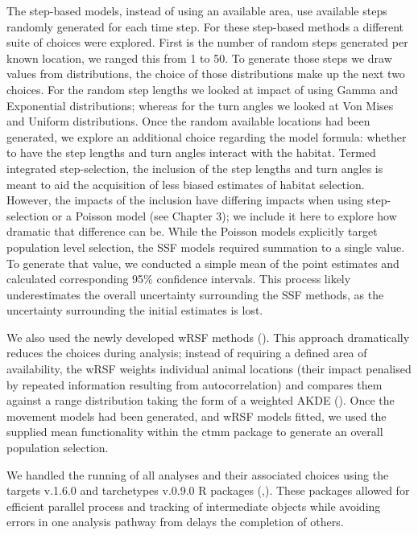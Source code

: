 \documentclass[10pt,a4paper]{article}
\begin{document}
The step-based models, instead of using an available area, use available steps randomly generated for each time step.
For these step-based methods a different suite of choices were explored.
First is the number of random steps generated per known location, we ranged this from 1 to 50.
To generate those steps we draw values from distributions, the choice of those distributions make up the next two choices.
For the random step lengths we looked at impact of using Gamma and Exponential distributions; whereas for the turn angles we looked at Von Mises and Uniform distributions.
Once the random available locations had been generated, we explore an additional choice regarding the model formula: whether to have the step lengths and turn angles interact with the habitat.
Termed integrated step-selection, the inclusion of the step lengths and turn angles is meant to aid the acquisition of less biased estimates of habitat selection.
However, the impacts of the inclusion have differing impacts when using step-selection or a Poisson model (see Chapter 3); we include it here to explore how dramatic that difference can be.
While the Poisson models explicitly target population level selection, the SSF models required summation to a single value.
To generate that value, we conducted a simple mean of the point estimates and calculated corresponding 95\% confidence intervals.
This process likely underestimates the overall uncertainty surrounding the SSF methods, as the uncertainty surrounding the initial estimates is lost.

We also used the newly developed wRSF methods ().
This approach dramatically reduces the choices during analysis; instead of requiring a defined area of availability, the wRSF weights individual animal locations (their impact penalised by repeated information resulting from autocorrelation) and compares them against a range distribution taking the form of a weighted AKDE ().
Once the movement models had been generated, and wRSF models fitted, we used the supplied mean functionality within the ctmm package to generate an overall population selection.

We handled the running of all analyses and their associated choices using the targets v.1.6.0 and tarchetypes v.0.9.0 R packages (,).
These packages allowed for efficient parallel process and tracking of intermediate objects while avoiding errors in one analysis pathway from delays the completion of others.
\end{document}
